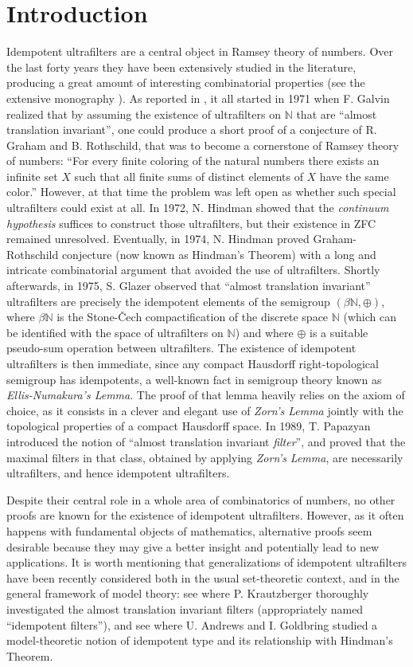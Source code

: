 \documentclass{amsart}
\theoremstyle{definition}
\theoremstyle{remark}
\def\N{\mathbb{N}}
\begin{document}
\section*{Introduction}
Idempotent ultrafilters are a central object in Ramsey
theory of numbers. Over the last forty years they
have been extensively studied in the literature, 
producing a great amount of interesting combinatorial properties 
(see the extensive monography \cite{hs}). 
As reported in \cite{h05}, it all started in 1971 when F. Galvin 
realized that by assuming the existence of ultrafilters on $\N$
that are ``almost translation invariant'', one 
could produce a short proof of a conjecture of 
R. Graham and B. Rothschild, that was to become
a cornerstone of Ramsey theory of numbers:
``For every finite coloring of the natural numbers there
exists an infinite set $X$ such that all finite sums
of distinct elements of $X$ have the same color.''
However, at that time the problem was left open as whether 
such special ultrafilters could exist at all.
In 1972, N. Hindman \cite{h72} showed that the 
\emph{continuum hypothesis} suffices to construct 
those ultrafilters, but their existence in \textsf{ZFC}
remained unresolved. Eventually, in 1974, N. Hindman \cite{h74}
proved Graham-Rothschild conjecture (now known as Hindman's Theorem)
with a long and intricate combinatorial argument that avoided the use of 
ultrafilters. Shortly afterwards, in 1975, S. Glazer observed
that ``almost translation invariant''
ultrafilters are precisely the idempotent elements of the
semigroup $(\beta\N,\oplus)$,
where $\beta\N$ is the Stone-\v{C}ech compactification
of the discrete space $\N$ (which can be identified
with the space of ultrafilters on $\N$)
and where $\oplus$ is a suitable pseudo-sum operation
between ultrafilters. 
The existence of idempotent ultrafilters is then immediate, 
since any compact Hausdorff right-topological semigroup has idempotents,
a well-known fact in semigroup theory
known as \emph{Ellis-Numakura's Lemma}.
The proof of that lemma heavily relies on the axiom
of choice, as it consists in a clever and 
elegant use of \emph{Zorn's Lemma}
jointly with the topological properties of a compact Hausdorff space.
In 1989, T. Papazyan \cite{p} introduced the notion of
``almost translation invariant \emph{filter}'', and proved that the
maximal filters in that class, obtained by applying \emph{Zorn's Lemma},
are necessarily ultrafilters, and hence idempotent ultrafilters.

Despite their central role in a whole area of combinatorics
of numbers, no other proofs are known for the existence of idempotent 
ultrafilters. However, as it often happens with fundamental objects of 
mathematics, alternative proofs seem desirable because they may 
give a better insight and potentially lead to new applications.
It is worth mentioning that generalizations of idempotent 
ultrafilters have been recently considered both in the usual 
set-theoretic context, and in the general framework of model theory:
see \cite{k} where P. Krautzberger thoroughly investigated 
the almost translation invariant filters (appropriately
named ``idempotent filters''), and see \cite{ag}
where U. Andrews and I. Goldbring studied
a model-theoretic notion of idempotent type
and its relationship with Hindman's Theorem.
\end{document}
